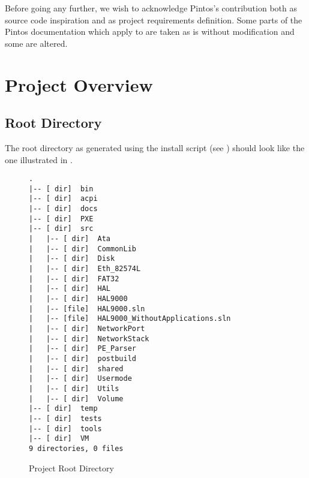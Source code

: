 Before going any further, we wish to acknowledge Pintos's contribution both as source code
inspiration and as project requirements definition. Some parts of the Pintos documentation which
apply to \projectname are taken as is without modification and some are altered.

\section{Project Overview}

\subsection{Root Directory}

The root directory as generated using the install script (see ) should look
like the one illustrated in .

\begin{figure}
\begin{verbatim}
.
|-- [ dir]  bin
|-- [ dir]  acpi
|-- [ dir]  docs
|-- [ dir]  PXE
|-- [ dir]  src
|   |-- [ dir]  Ata
|   |-- [ dir]  CommonLib
|   |-- [ dir]  Disk
|   |-- [ dir]  Eth_82574L
|   |-- [ dir]  FAT32
|   |-- [ dir]  HAL
|   |-- [ dir]  HAL9000
|   |-- [file]  HAL9000.sln
|   |-- [file]  HAL9000_WithoutApplications.sln
|   |-- [ dir]  NetworkPort
|   |-- [ dir]  NetworkStack
|   |-- [ dir]  PE_Parser
|   |-- [ dir]  postbuild
|   |-- [ dir]  shared
|   |-- [ dir]  Usermode
|   |-- [ dir]  Utils
|   |-- [ dir]  Volume
|-- [ dir]  temp
|-- [ dir]  tests
|-- [ dir]  tools
|-- [ dir]  VM
9 directories, 0 files
\end{verbatim}
\caption{Project Root Directory}
\label{fig:ProjectRoot}
\end{figure}

